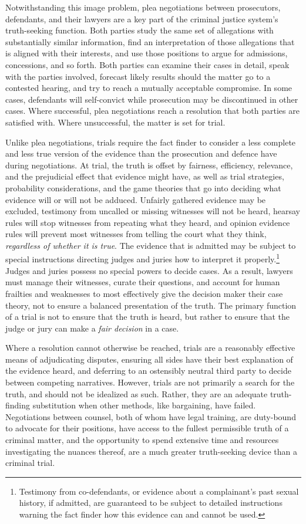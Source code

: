 Notwithstanding this image problem, plea negotiations between prosecutors, defendants, and their lawyers are a key part of the criminal justice system's truth-seeking function. Both parties study the same set of allegations with substantially similar information, find an interpretation of those allegations that is aligned with their interests, and use those positions to argue for admissions, concessions, and so forth. Both parties can examine their cases in detail, speak with the parties involved, forecast likely results should the matter go to a contested hearing, and try to reach a mutually acceptable compromise. In some cases, defendants will self-convict while prosecution may be discontinued in other cases. Where successful, plea negotiations reach a resolution that both parties are satisfied with. Where unsuccessful, the matter is set for trial.

Unlike plea negotiations, trials require the fact finder to consider a less complete and less true version of the evidence than the prosecution and defence have during negotiations. At trial, the truth is offset by fairness, efficiency, relevance, and the prejudicial effect that evidence might have, as well as trial strategies, probability considerations, and the game theories that go into deciding what evidence will or will not be adduced. Unfairly gathered evidence may be excluded, testimony from uncalled or missing witnesses will not be heard, hearsay rules will stop witnesses from repeating what they heard, and opinion evidence rules will prevent most witnesses from telling the court what they think, \textit{regardless of whether it is true}. The evidence that is admitted may be subject to special instructions directing judges and juries how to interpret it properly.\footnote{Testimony from co-defendants, or evidence about a complainant's past sexual history, if admitted, are guaranteed to be subject to detailed instructions warning the fact finder how this evidence can and cannot be used.} Judges and juries possess no special powers to decide cases. As a result, lawyers must manage their witnesses, curate their questions, and account for human frailties and weaknesses to most effectively give the decision maker their case theory, not to ensure a balanced presentation of the truth. The primary function of a trial is not to ensure that the truth is heard, but rather to ensure that the judge or jury can make a \textit{fair decision} in a case. 

Where a resolution cannot otherwise be reached, trials are a reasonably effective means of adjudicating disputes, ensuring all sides have their best explanation of the evidence heard, and deferring to an ostensibly neutral third party to decide between competing narratives. However, trials are not primarily a search for the truth, and should not be idealized as such. Rather, they are an adequate truth-finding substitution when other methods, like bargaining, have failed. Negotiations between counsel, both of whom have legal training, are duty-bound to advocate for their positions, have access to the fullest permissible truth of a criminal matter, and the opportunity to spend extensive time and resources investigating the nuances thereof, are a much greater truth-seeking device than a criminal trial.

